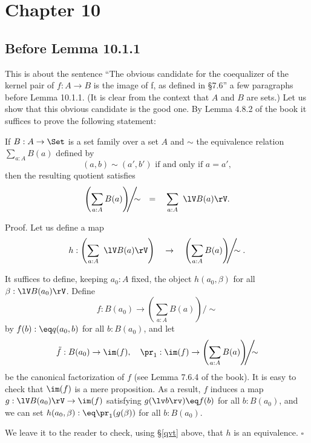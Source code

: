 \documentclass[12pt]{article}
\begin{document}

\section{Chapter 10}

\subsection{Before Lemma 10.1.1}

This is about the sentence ``The obvious candidate for the coequalizer of the kernel pair of $f:A\to B$ is the image of f, as defined in \S7.6'' a few paragraphs before Lemma 10.1.1. (It is clear from the context that $A$ and $B$ are sets.) Let us show that this obvious candidate is the good one. By Lemma 4.8.2 of the book it suffices to prove the following statement:

If $B:A\to\Set$ is a set family over a set $A$ and $\sim$ the equivalence relation $\sum_{a:A}B(a)$ defined by 
$$
(a,b)\sim(a',b')\text{ if and only if }a=a',
$$ 
then the resulting quotient satisfies
$$
\left(\sum_{a:A}B(a)\right)\!\!\!\Bigg/\!\!\!\!\sim\quad=\quad\sum_{a:A}\ \lV B(a)\rV.
$$

Proof. Let us define a map 
$$
h:\left(\sum_{a:A}\ \lV B(a)\rV\right)\quad\to\quad\left(\sum_{a:A}B(a)\right)\!\!\!\Bigg/\!\!\!\!\sim.
$$ 

It suffices to define, keeping $a_0:A$ fixed, the object $h(a_0,\beta)$ for all $\beta:\lV B(a_0)\rV$. Define 
$$
f:B(a_0)\to\left(\sum_{a:A}B(a)\right)\!\!\!\Bigg/\!\!\!\!\sim
$$ 
by $f(b):\eq q(a_0,b)$ for all $b:B(a_0)$, and let 
$$
\tilde f:B(a_0)\to\im(f),\quad\pr_1:\im(f)\to\left(\sum_{a:A}B(a)\right)\!\!\!\Bigg/\!\!\!\!\sim
$$ 
be the canonical factorization of $f$ (see Lemma 7.6.4 of the book). It is easy to check that $\im(f)$ is a mere proposition. As a result, $f$ induces a map $g:\lV B(a_0)\rV\to\im(f)$ satisfying $g(\lv b\rv)\eq f(b)$ for all $b:B(a_0)$, and we can set $h(a_0,\beta):\eq\pr_1(g(\beta))$ for all $b:B(a_0)$.

We leave it to the reader to check, using \S\ref{qvt} above, that $h$ is an equivalence. $\square$
\end{document}
